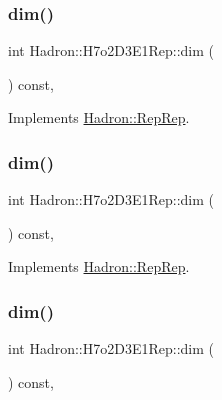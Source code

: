 \subsubsection{\texorpdfstring{dim()}{dim()}\hspace{0.1cm}{\footnotesize\ttfamily [3/5]}}
{\footnotesize\ttfamily int Hadron\+::\+H7o2\+D3\+E1\+Rep\+::dim (\begin{DoxyParamCaption}{ }\end{DoxyParamCaption}) const\hspace{0.3cm}{\ttfamily [inline]}, {\ttfamily [virtual]}}



Implements \mbox{\hyperlink{structHadron_1_1RepRep_a92c8802e5ed7afd7da43ccfd5b7cd92b}{Hadron\+::\+Rep\+Rep}}.

\mbox{\label{structHadron_1_1H7o2D3E1Rep_a1dd01ae39e29a77dc0082769e31af9cf}} 
\subsubsection{\texorpdfstring{dim()}{dim()}\hspace{0.1cm}{\footnotesize\ttfamily [4/5]}}
{\footnotesize\ttfamily int Hadron\+::\+H7o2\+D3\+E1\+Rep\+::dim (\begin{DoxyParamCaption}{ }\end{DoxyParamCaption}) const\hspace{0.3cm}{\ttfamily [inline]}, {\ttfamily [virtual]}}



Implements \mbox{\hyperlink{structHadron_1_1RepRep_a92c8802e5ed7afd7da43ccfd5b7cd92b}{Hadron\+::\+Rep\+Rep}}.

\mbox{\label{structHadron_1_1H7o2D3E1Rep_a1dd01ae39e29a77dc0082769e31af9cf}} 
\subsubsection{\texorpdfstring{dim()}{dim()}\hspace{0.1cm}{\footnotesize\ttfamily [5/5]}}
{\footnotesize\ttfamily int Hadron\+::\+H7o2\+D3\+E1\+Rep\+::dim (\begin{DoxyParamCaption}{ }\end{DoxyParamCaption}) const\hspace{0.3cm}{\ttfamily [inline]}, {\ttfamily [virtual]}}



